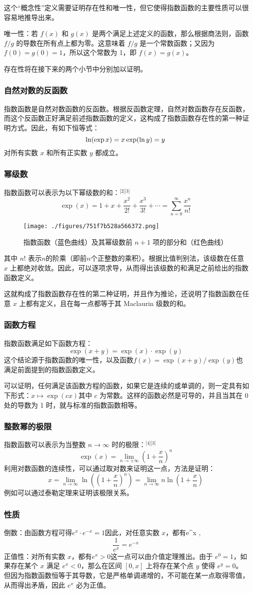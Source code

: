 这个“概念性”定义需要证明存在性和唯一性，但它使得指数函数的主要性质可以很容易地推导出来。

唯一性：若 $f(x)$ 和 $g(x)$ 是两个满足上述定义的函数，那么根据商法则，函数 $f/g$ 的导数在所有点上都为零。这意味着 $f/g$ 是一个常数函数；又因为 $f(0) = g(0) = 1$，所以这个常数为 1，即 $f(x) = g(x)$。

存在性将在接下来的两个小节中分别加以证明。
\subsubsection{自然对数的反函数}
指数函数是自然对数函数的反函数。根据反函数定理，自然对数函数存在反函数，而这个反函数正好满足前述指数函数的定义，这构成了指数函数存在性的第一种证明方式。因此，有如下恒等式：
$$
\ln(\exp x) = x \\
\exp(\ln y) = y~
$$
对所有实数 $x$ 和所有正实数 $y$ 都成立。
\subsubsection{幂级数}
指数函数可以表示为以下幂级数的和：\(^\text{[2][3]}\)
$$
\exp(x) = 1 + x + \frac{x^2}{2!} + \frac{x^3}{3!} + \cdots = \sum_{n=0}^{\infty} \frac{x^n}{n!}~
$$
\begin{figure}[ht]
\centering
\texttt{[image: ./figures/751f7b528a566372.png]}
\caption{指数函数（蓝色曲线）及其幂级数前 $n + 1$ 项的部分和（红色曲线）} \label{fig_ZShs_2}
\end{figure}
其中 $n!$ 表示$n$的阶乘（即前$n$个正整数的乘积）。根据比值判别法，该级数在任意 $x$ 上都绝对收敛。因此，可以逐项求导，从而得出该级数的和满足之前给出的指数函数定义。

这就构成了指数函数存在性的第二种证明，并且作为推论，还说明了指数函数在任意 $x$ 上都有定义，且在每一点都等于其 Maclaurin 级数的和。
\subsubsection{函数方程}
指数函数满足如下函数方程：
$$
\exp(x + y) = \exp(x) \cdot \exp(y)~
$$
这个结论源于指数函数的唯一性，以及函数$f(x) = \exp(x + y)/\exp(y)$也满足前面提到的指数函数定义。

可以证明，任何满足该函数方程的函数，如果它是连续的或单调的，则一定具有如下形式：$x \mapsto \exp(c x)$其中 $c$ 为常数。这样的函数必然是可导的，并且当其在 0 处的导数为 1 时，就与标准的指数函数相等。
\subsubsection{整数幂的极限}
指数函数可以表示为当整数 $n \to \infty$ 时的极限：\(^\text{[4][3]}\)
$$
\exp(x) = \lim_{n \to +\infty} \left(1 + \frac{x}{n}\right)^n~
$$
利用对数函数的连续性，可以通过取对数来证明这一点，方法是证明：
$$
x = \lim_{n \to \infty} \ln\left( \left(1 + \frac{x}{n} \right)^n \right) = \lim_{n \to \infty} n \ln\left(1 + \frac{x}{n} \right)~
$$
例如可以通过泰勒定理来证明该极限关系。
\subsubsection{性质}
倒数：由函数方程可得$e^x \cdot e^{-x} = 1$因此，对任意实数 $x$，都有e^x ,$$\frac{1}{e^x} = e^{-x}~$$正值性：对所有实数 $x$，都有$e^x > 0$这一点可以由介值定理推出。由于 $e^0 = 1$，如果存在某个 $x$ 满足 $e^x < 0$，那么在区间 $[0, x]$ 上将存在某个点 $y$ 使得 $e^y = 0$。但因为指数函数恒等于其导数，它是严格单调递增的，不可能在某一点取得零值，从而得出矛盾，因此 $e^x$ 必为正值。

